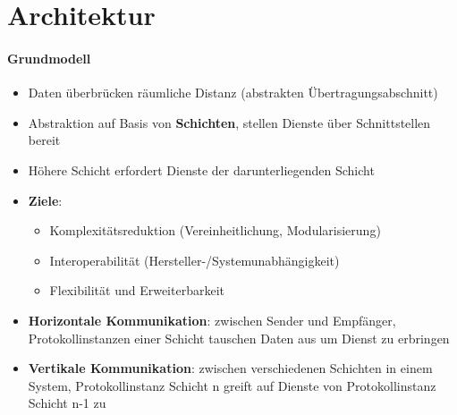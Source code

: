 \section{Architektur}

\paragraph{Grundmodell}
\begin{itemize}
	\item Daten überbrücken räumliche Distanz (abstrakten Übertragungsabschnitt)
	\item Abstraktion auf Basis von \textbf{Schichten}, stellen Dienste über Schnittstellen bereit
	\item Höhere Schicht erfordert Dienste der darunterliegenden Schicht
	\item \textbf{Ziele}:
	\begin{itemize}
    \item Komplexitätsreduktion (Vereinheitlichung, Modularisierung)
    \item Interoperabilität (Hersteller-/Systemunabhängigkeit)
    \item Flexibilität und Erweiterbarkeit
  \end{itemize}
	\item \textbf{Horizontale Kommunikation}: zwischen Sender und Empfänger, Protokollinstanzen einer Schicht tauschen Daten aus um Dienst zu erbringen
	\item \textbf{Vertikale Kommunikation}: zwischen verschiedenen Schichten in einem System, Protokollinstanz Schicht n greift auf Dienste von Protokollinstanz Schicht n-1 zu
\end{itemize}

